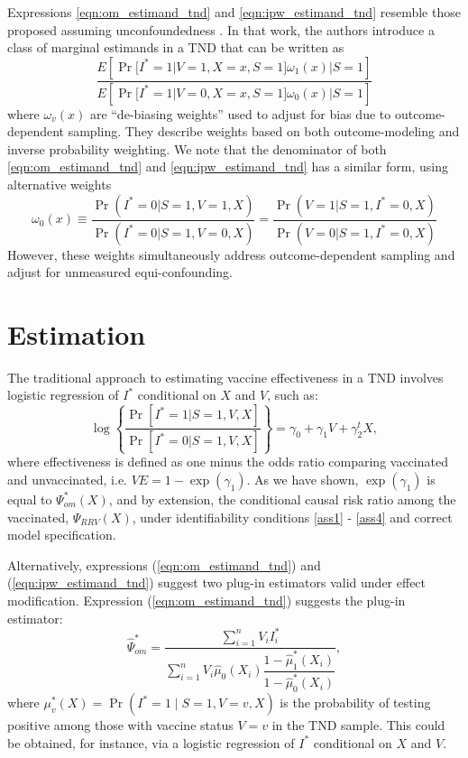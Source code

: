 \documentclass[11pt]{article}
\begin{document}
 \begin{remark}
     Expressions \ref{eqn:om_estimand_tnd} and  \ref{eqn:ipw_estimand_tnd} resemble those proposed assuming unconfoundedness \cite{jiang_tnddr_2023}. In that work, the authors introduce a class of marginal estimands in a TND that can be written as 
     \begin{equation*}
         \dfrac{E\left[\Pr[I^* = 1 | V = 1, X = x, S = 1]\omega_1(x) | S = 1 \right]}{E\left[\Pr[I^* = 1 | V = 0, X = x, S = 1]\omega_0(x) | S = 1\right]}
     \end{equation*}
     where $\omega_v(x)$ are ``de-biasing weights'' used to adjust for bias due to outcome-dependent sampling. They describe weights based on both outcome-modeling and inverse probability weighting. We note that the denominator of both \ref{eqn:om_estimand_tnd} and  \ref{eqn:ipw_estimand_tnd} has a similar form, using alternative weights 
     \begin{equation*}
         \omega_0(x) \equiv \dfrac{\Pr(I^* = 0 | S = 1, V = 1, X)}{\Pr(I^* = 0| S = 1, V = 0, X)} = \dfrac{\Pr(V=1 | S = 1, I^* = 0, X)}{\Pr(V=0| S = 1, I^* = 0, X)}
     \end{equation*}
     However, these weights simultaneously address outcome-dependent sampling and adjust for unmeasured equi-confounding. 
 \end{remark}

\section{Estimation}\label{sec:estimation}
The traditional approach to estimating vaccine effectiveness in a TND involves logistic regression of $I^*$ conditional on $X$ and $V$, such as:
$$\log \left\{\dfrac{\Pr[I^* = 1 | S = 1, V, X]}{\Pr[I^* = 0 | S = 1, V, X]}\right\} = \gamma_0 + \gamma_1 V + \gamma_2^t X,$$
where effectiveness is defined as one minus the odds ratio comparing vaccinated and unvaccinated, i.e. $VE = 1 - \exp(\gamma_1)$. As we have shown, $\exp(\gamma_1)$ is equal to $\Psi^*_{om}(X)$, and by extension, the conditional causal risk ratio among the vaccinated, $\Psi_{RRV}(X)$, under identifiability conditions \ref{ass1} - \ref{ass4} and correct model specification. 

Alternatively, expressions (\ref{eqn:om_estimand_tnd}) and (\ref{eqn:ipw_estimand_tnd}) suggest two plug-in estimators valid under effect modification. Expression (\ref{eqn:om_estimand_tnd}) suggests the plug-in estimator:
\begin{equation}\label{eqn:om_estimator}
    \widehat{\Psi}_{om}^* = \dfrac{\sum_{i=1}^n V_i I^*_i}{\sum_{i=1}^n V_i \widehat{\mu}_0(X_i)\dfrac{1 - \widehat{\mu}^*_1(X_i)}{1 - \widehat{\mu}^*_0(X_i)}},
\end{equation}
where $\mu^*_v(X) = \Pr(I^*=1\mid S=1, V=v, X)$ is the probability of testing positive among those with vaccine status $V =v$ in the TND sample. This could be obtained, for instance, via a logistic regression of $I^*$ conditional on $X$ and $V$.
\end{document}
